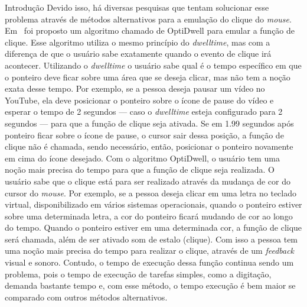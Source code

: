 \begin{chapter}{Introdução}
Devido isso, há diversas pesquisas que tentam solucionar esse problema através de
métodos alternativos para a emulação do clique do \textit{mouse}.
Em~\cite{Aanand18} foi proposto um algoritmo chamado de OptiDwell para emular a
função de clique. Esse algoritmo utiliza o mesmo princípio do
\textit{dwelltime}, mas com a diferença de que o usuário sabe exatamente quando
o evento de clique irá acontecer. Utilizando o \textit{dwelltime} o usuário sabe qual é o
tempo específico em que o ponteiro deve ficar sobre uma área que se deseja
clicar, mas não tem a noção exata desse tempo. Por exemplo, se a pessoa deseja
pausar um vídeo no YouTube, ela deve posicionar o ponteiro sobre o ícone de
pause do vídeo e esperar o tempo de 2 segundos --- caso o \textit{dwelltime}
esteja configurado para 2 segundos --- para que a função de clique seja ativada.
Se em 1.99 segundos após ponteiro ficar sobre o ícone de pause, o cursor sair
dessa posição, a função de clique não é chamada, sendo necessário, então,
posicionar o ponteiro novamente em cima do ícone desejado. Com o algoritmo
OptiDwell, o usuário tem uma noção mais precisa do tempo para que a função de
clique seja realizada. O usuário sabe que o clique está para ser realizado
através da mudança de cor do cursor do \textit{mouse}. Por
exemplo, se a pessoa deseja clicar em uma letra no teclado virtual,
disponibilizado em vários sistemas operacionais, quando o ponteiro estiver sobre
uma determinada letra, a cor do ponteiro ficará mudando de cor ao longo do
tempo. Quando o ponteiro estiver em uma determinada cor, a função de clique será
chamada, além de ser ativado som de estalo (clique). Com isso a pessoa tem uma
noção mais precisa do tempo para realizar o clique, através de um
\textit{feedback} visual e sonoro. Contudo, o tempo de execução dessa função
continua sendo um problema, pois o tempo de execução de tarefas simples, como a
digitação, demanda bastante tempo e, com esse método, o tempo execução é bem maior
se comparado com outros métodos alternativos.


\end{chapter}
